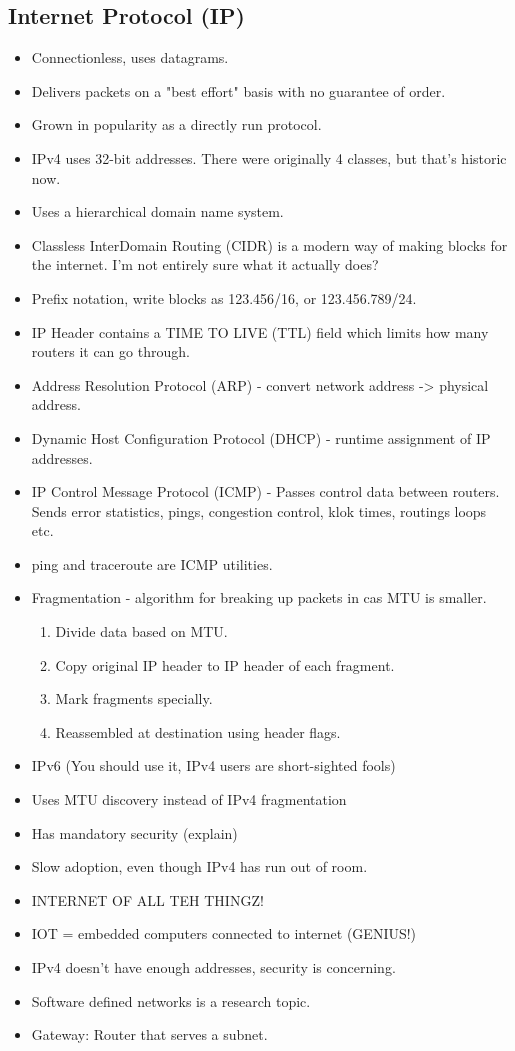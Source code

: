\documentclass{scrartcl}
\begin{document}
\subsection*{Internet Protocol (IP)}
\begin{itemize}
\item Connectionless, uses datagrams.
\item Delivers packets on a "best effort" basis with no guarantee of order.
\item Grown in popularity as a directly run protocol.
\item IPv4 uses 32-bit addresses. There were originally 4 classes, but that's
 historic now.
\item Uses a hierarchical domain name system.
\item Classless InterDomain Routing (CIDR) is a modern way of making blocks
 for the internet. I'm not entirely sure what it actually does?
\item Prefix notation, write blocks as 123.456/16, or 123.456.789/24.
\item IP Header contains a TIME TO LIVE (TTL) field which limits how many
 routers it can go through.
\item Address Resolution Protocol (ARP) - convert network address -> physical
 address.
\item Dynamic Host Configuration Protocol (DHCP) - runtime assignment of IP
 addresses.
\item IP Control Message Protocol (ICMP) - Passes control data between routers.
 Sends error statistics, pings, congestion control, klok times, routings loops
 etc.
\item ping and traceroute are ICMP utilities.
\item Fragmentation - algorithm for breaking up packets in cas MTU is smaller.
\begin{enumerate}
\item Divide data based on MTU.
\item Copy original IP header to IP header of each fragment.
\item Mark fragments specially.
\item Reassembled at destination using header flags.
\end{enumerate}
\item IPv6 (You should use it, IPv4 users are short-sighted fools)
\item Uses MTU discovery instead of IPv4 fragmentation
\item Has mandatory security (explain)
\item Slow adoption, even though IPv4 has run out of room.
\item INTERNET OF ALL TEH THINGZ!
\item IOT = embedded computers connected to internet (GENIUS!)
\item IPv4 doesn't have enough addresses, security is concerning.
\item Software defined networks is a research topic.
\item Gateway: Router that serves a subnet.
\end{itemize}
\end{document}
